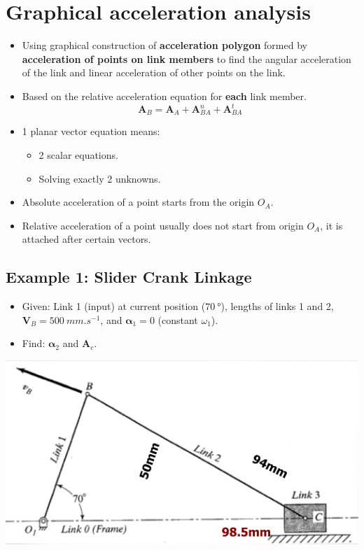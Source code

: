 \documentclass[11pt]{article}
\begin{document}
\section{Graphical acceleration analysis}
\label{sec:org2f711c4}
\begin{itemize}
\item Using graphical construction of \textbf{acceleration polygon} formed by \textbf{acceleration of points on link members} to find the angular acceleration of the link and linear acceleration of other points on the link.
\item Based on the relative acceleration equation for \textbf{each} link member.
\[\boldsymbol{A}_B = \boldsymbol{A}_A + \boldsymbol{A}_{BA}^n + \boldsymbol{A}_{BA}^t\]
\item 1 planar vector equation means:
\begin{itemize}
\item 2 scalar equations.
\item Solving exactly 2 unknowns.
\end{itemize}
\item Absolute acceleration of a point starts from the origin \(O_A\).
\item Relative acceleration of a point usually does not start from origin \(O_A\), it is attached after certain vectors.
\end{itemize}
\subsection{Example 1: Slider Crank Linkage}
\label{sec:org1921f92}
\begin{itemize}
\item Given: Link 1 (input) at current position (\(\qty{70}{\degree}\)), lengths of links 1 and 2, \(\boldsymbol{V}_B = \qty{500}{mm.s^{-1}}\), and \(\boldsymbol{\alpha}_1 = 0\) (constant \(\omega_1\)).
\item Find: \(\boldsymbol{\alpha}_2\) and \(\boldsymbol{A}_c\).
\end{itemize}

\begin{center}
\includegraphics[width=.9\linewidth]{./images/slider-crank-linkage-graphical-analysis-example.png}
\end{center}
\end{document}
